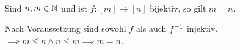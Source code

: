 \documentclass[../ana1.tex]{subfiles}
\begin{document}

\begin{kor}\label{satz:schubfach:kor_2}\leavevmode \\
	Sind \(n, m \in\mathbb{N} \) und ist \(f \colon [m] \longrightarrow[n] \) bijektiv, so gilt \(m = n \).
\end{kor}
\begin{bew}
	Nach Voraussetzung sind sowohl \(f \) als auch \(\inverse{f} \) injektiv. \\
	\(\implies m \leq n \wedge n \leq m \implies m = n \).
\end{bew}
\end{document}

